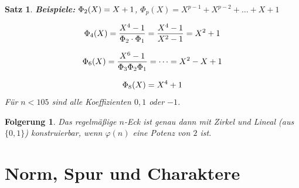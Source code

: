 \documentclass[a4paper,10pt,german]{scrbook}
\theoremstyle{saetze}
\newtheorem{Satz}{Satz}
\theoremstyle{definitionen}
\newtheorem{Folg}[Def]{Folgerung}
\begin{document}
\begin{Satz}
\textbf{\newline Beispiele:} $\displaystyle\Phi_2(X) = X+1$, $\Phi_p(X) =
X^{p-1} + X^{p-2} + \dots + X + 1$

\[\Phi_4(X) = \frac{X^4-1}{\Phi_2 \cdot \Phi_1} = \frac{X^4-1}{X^2 -1} =
X^2 + 1\]

\[\displaystyle\Phi_6(X) = \frac{X^6-1}{\Phi_3 \Phi_2 \Phi_1} = \dots = X^2 - X
+ 1\]

\[\displaystyle\Phi_8(X) = X^4 +1\] \newline\newline Für $n < 105$ sind alle
Koeffizienten $0,1$ oder $-1$.
\end{Satz}

\begin{Folg}
Das regelmäßige $n$-Eck ist genau dann mit
Zirkel und Lineal (aus $\{0,1\}$) konstruierbar, wenn $\varphi(n)$ eine Potenz von
$2$ ist.
\end{Folg}
\section{Norm, Spur und Charaktere}
\end{document}
